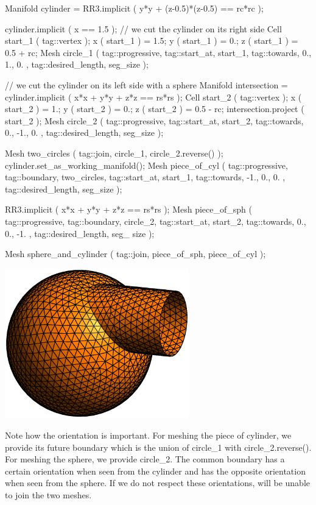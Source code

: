    Manifold cylinder = RR3.implicit ( y*y + (z-0.5)*(z-0.5) == rc*rc );

   cylinder.implicit ( x == 1.5 );  // we cut the cylinder on its right side
   Cell start_1 ( tag::vertex );
   x ( start_1 ) = 1.5;  y ( start_1 ) = 0.;  z ( start_1 ) = 0.5 + rc;
   Mesh circle_1 ( tag::progressive, tag::start_at, start_1,
                   tag::towards, { 0., 1., 0. }, tag::desired_length, seg_size );

   // we cut the cylinder on its left side with a sphere
   Manifold intersection = cylinder.implicit ( x*x + y*y + z*z == rs*rs );
   Cell start_2 ( tag::vertex );
   x ( start_2 ) = 1.;  y ( start_2 ) = 0.;  z ( start_2 ) = 0.5 - rc;
   intersection.project ( start_2 );
   Mesh circle_2 ( tag::progressive, tag::start_at, start_2,
                   tag::towards, { 0., -1., 0. }, tag::desired_length, seg_size );

   Mesh two_circles ( tag::join, circle_1, circle_2.reverse() );
   cylinder.set_as_working_manifold();
   Mesh piece_of_cyl ( tag::progressive, tag::boundary, two_circles,
                       tag::start_at, start_1, tag::towards, { -1., 0., 0. },
                       tag::desired_length, seg_size                          );

   RR3.implicit ( x*x + y*y + z*z == rs*rs );
   Mesh piece_of_sph ( tag::progressive, tag::boundary, circle_2,
                       tag::start_at, start_2, tag::towards, { 0., 0., -1. },
                       tag::desired_length, seg_ size                         );

   Mesh sphere_and_cylinder ( tag::join, piece_of_sph, piece_of_cyl );
\endverbatim

\medskip
\centerline{\includegraphics[width=80mm]{sphere-cyl.eps}}
\medskip

Note how the orientation is important.
For meshing the piece of cylinder, we provide its future boundary which is the union of
{\codett circle\_1} with {\codett circle\_2.reverse()}.
For meshing the sphere, we provide {\codett circle\_2}.
The common boundary has a certain orientation when seen from the cylinder and has the opposite
orientation when seen from the sphere.
If we do not respect these orientations, {\maniFEM} will be unable to {\codett join} the two
meshes.

